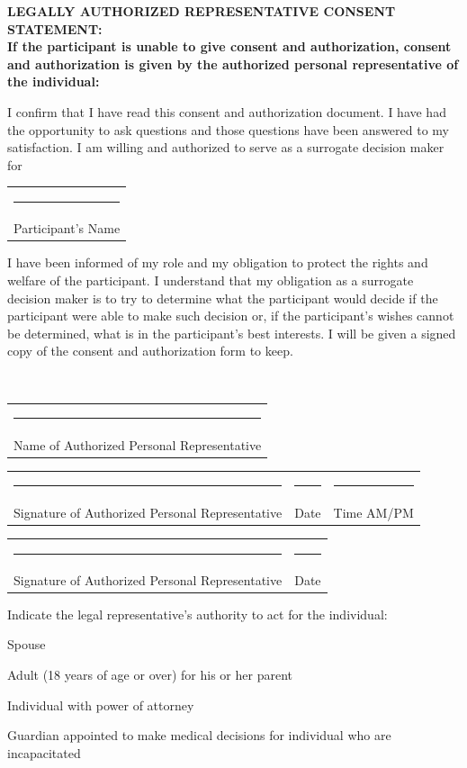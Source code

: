 \documentclass[11pt]{article}
\makeatletter
\newcommand{\Sig}[1]{%
\setlength\extrarowheight{1pt}
\begin{tabular}{@{}>{\raggedright}p{0.5\textwidth}}
\rule{0.48\textwidth}{0.1mm} \\
#1 \\
\end{tabular}
}
\newcommand{\SigDate}[1]{%
\setlength\extrarowheight{1pt}
\begin{tabular}{@{}>{\raggedright}p{0.5\textwidth}>{\raggedright\arraybackslash}p{0.2\textwidth}}
\rule{0.48\textwidth}{0.1mm} &  \rule{0.2\textwidth}{0.1mm} \\
#1 &  Date \\
\end{tabular}
}
\newcommand{\SigDateTime}[1]{%
\setlength\extrarowheight{1pt}
\begin{tabularx}{\textwidth}{@{}>{\raggedright}p{0.5\textwidth}>{\raggedright}X>{\raggedright\arraybackslash}p{0.2\textwidth}@{}}
\rule{0.48\textwidth}{0.1mm} &  \rule{0.2\textwidth}{0.1mm} &  \rule{0.2\textwidth}{0.1mm} \\
#1 & Date & Time AM/PM\\
\end{tabularx}
}
\makeatother
\begin{document}

%
{%
\textbf{LEGALLY AUTHORIZED REPRESENTATIVE CONSENT STATEMENT:}\\
\textbf{If the participant is unable to give consent and
authorization, consent and authorization is given by
the authorized personal representative of the individual:}

I confirm that I have read this consent and authorization
document. I have had the opportunity to ask questions and
those questions have been answered to my satisfaction. I
am willing and authorized  to serve as a surrogate decision
maker for

\Sig{Participant's Name}

I have been informed of my role and my obligation to protect the rights and welfare of the
participant. I understand that my obligation as a surrogate decision maker is to try to
determine what the participant would decide if the participant were able to make such decision
or, if the participant's wishes cannot be determined, what is in the participant's best interests.
I will be given a signed copy of the consent and authorization form to keep.

\ \\

\Sig{Name of Authorized Personal Representative}

%
{%
\SigDateTime{Signature of Authorized Personal Representative}
}%
{%
\SigDate{Signature of Authorized Personal Representative}
}%

Indicate the legal representative's authority to act for the individual:
\begin{compactitem}
\renewcommand{\labelitemi}{$\square$}
    \item Spouse
    \item Adult (18 years of age or over) for his or her parent
    \item Individual with power of attorney
    \item Guardian appointed to make medical decisions for individual who are incapacitated
\end{compactitem}

\newpage

}%
{}%

\end{document}
